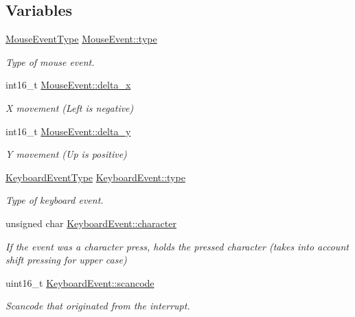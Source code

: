 \subsection*{Variables}
\begin{DoxyCompactItemize}
\item 
\mbox{\hyperlink{group__event_ga262cb54ad20544f03867d1962cdf9ec9}{Mouse\+Event\+Type}} \mbox{\hyperlink{group__event_ga44b4240ab9b63b86e68d3e0ba4b64407}{Mouse\+Event\+::type}}
\begin{DoxyCompactList}\small\item\em Type of mouse event. \end{DoxyCompactList}\item 
int16\+\_\+t \mbox{\hyperlink{group__event_ga41f621f2189d0bc748e80c1ddc89d292}{Mouse\+Event\+::delta\+\_\+x}}
\begin{DoxyCompactList}\small\item\em X movement (Left is negative) \end{DoxyCompactList}\item 
int16\+\_\+t \mbox{\hyperlink{group__event_ga3420770b5a1a73976be777d8bd7a3c4c}{Mouse\+Event\+::delta\+\_\+y}}
\begin{DoxyCompactList}\small\item\em Y movement (Up is positive) \end{DoxyCompactList}\item 
\mbox{\hyperlink{group__event_ga65afc57ec37493fc7409f26a189ab104}{Keyboard\+Event\+Type}} \mbox{\hyperlink{group__event_ga88ca71424bb0d59efe2a10e65cdb52f0}{Keyboard\+Event\+::type}}
\begin{DoxyCompactList}\small\item\em Type of keyboard event. \end{DoxyCompactList}\item 
unsigned char \mbox{\hyperlink{group__event_gaadaa71d48b0af51dc033410dac4b204e}{Keyboard\+Event\+::character}}
\begin{DoxyCompactList}\small\item\em If the event was a character press, holds the pressed character (takes into account shift pressing for upper case) \end{DoxyCompactList}\item 
uint16\+\_\+t \mbox{\hyperlink{group__event_gad4aa052be4d1b19f7729750811c00938}{Keyboard\+Event\+::scancode}}
\begin{DoxyCompactList}\small\item\em Scancode that originated from the interrupt. \end{DoxyCompactList}\item 

\end{DoxyCompactItemize}
